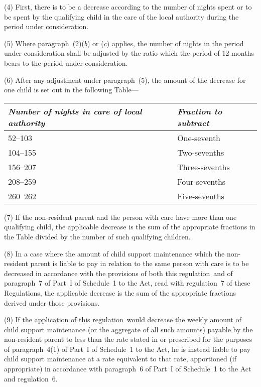 \documentclass[12pt,a4paper]{article}
\begin{document}
(4) First, there is to be a decrease according to the number of nights spent or to be spent by the qualifying child in the care of the local authority during the period under consideration.

(5) Where paragraph~(2)($b$)  or ($c$)  applies, the number of nights in the period under consideration shall be adjusted by the ratio which the period of 12 months bears to the period under consideration.

(6) After any adjustment under paragraph~(5), the amount of the decrease for one child is set out in the following Table—

\begin{center}
\footnotesize
\begin{tabular}{ll}
\hline
\itshape Number of nights in care of local authority	& \itshape Fraction to subtract\\
\hline
52–103	&One-seventh\\
104–155	&Two-sevenths\\
156–207	&Three-sevenths\\
208–259	&Four-sevenths\\
260–262	&Five-sevenths\\
\hline
\end{tabular}
\end{center}

(7) If the non-resident parent and the person with care have more than one qualifying child, the applicable decrease is the sum of the appropriate fractions in the Table divided by the number of such qualifying children.

(8) In a case where the amount of child support maintenance which the non-resident parent is liable to pay in relation to the same person with care is to be decreased in accordance with the provisions of both this regulation~and of paragraph~7 of Part~I of Schedule~1 to the Act, read with regulation~7 of these Regulations, the applicable decrease is the sum of the appropriate fractions derived under those provisions.

\begin{sloppypar}
(9) If the application of this regulation~would decrease the weekly amount of child support maintenance (or the aggregate of all such amounts) payable by the non-resident parent to less than the rate stated in or prescribed for the purposes of paragraph~4(1) of Part~I of Schedule~1 to the Act, he is instead liable to pay child support maintenance at a rate equivalent to that rate, apportioned (if appropriate) in accordance with paragraph~6 of Part~I of Schedule~1 to the Act and regulation~6.
\end{sloppypar}
\end{document}

